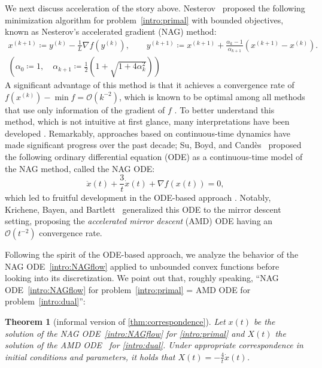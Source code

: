 \documentclass[11pt,a4paper]{article}
\theoremstyle{definition}
\theoremstyle{plain}
\newtheorem{thm}{Theorem}[section]
\begin{document}
We next discuss acceleration of the story above.
Nesterov~\cite{Nesterov1983} proposed the following minimization algorithm for problem~\eqref{intro:primal} with bounded objectives, known as Nesterov's accelerated gradient (NAG) method:
\begin{equation}\label{intro:NAG}
    \begin{gathered}
            x^{(k + 1)} \coloneqq y^{(k)} - \frac1L\nabla f\left(y^{(k)}\right), \qquad y^{(k + 1)} \coloneqq x^{(k + 1)} + \frac{\alpha_k - 1}{\alpha_{k + 1}}\left(x^{(k + 1)} - x^{(k)}\right).\\
        (\alpha_0 \coloneqq 1,\quad \alpha_{k + 1} \coloneqq \frac12\left(1 +\sqrt{1 + 4\alpha_k^2}\right))
    \end{gathered}
\end{equation}
A significant advantage of this method is that it achieves a convergence rate of $f(x^{(k)}) - \min f = \mathcal{O}(k^{-2})$, which is known to be optimal among all methods that use only information of the gradient of $f$ \cite{Nesterov2018}.
To better understand this method, which is not intuitive at first glance, many interpretations have been developed \cite{AS2022,AO2017,DO2019}.
Remarkably, approaches based on continuous-time dynamics have made significant progress over the past decade; Su, Boyd, and Cand\`{e}s~\cite{SBC2016} proposed the following ordinary differential equation (ODE) as a continuous-time model of the NAG method, called the NAG ODE:
\begin{equation}\label{intro:NAGflow}
    \ddot x(t) +\frac3t\dot x(t) + \nabla f(x(t)) = 0,
\end{equation}
which led to fruitful development in the ODE-based approach \cite{SDJS2022,WWJ2016,WilsonPhD,WRJ2021}.
Notably, Krichene, Bayen, and Bartlett~\cite{KBB2015} generalized this ODE to the mirror descent setting, proposing the \textit{accelerated mirror descent} (AMD) ODE having an $\mathcal{O}(t^{-2})$ convergence rate.

Following the spirit of the ODE-based approach, we analyze the behavior of the NAG ODE~\eqref{intro:NAGflow} applied to unbounded convex functions before looking into its discretization.
We point out that, roughly speaking, ``NAG ODE~\eqref{intro:NAGflow} for problem~\eqref{intro:primal} = AMD ODE for problem~\eqref{intro:dual}'':

\begin{thm}[informal version of \cref{thm:correspondence}]
    Let $x(t)$ be the solution of the NAG ODE~\eqref{intro:NAGflow} for \eqref{intro:primal} and $X(t)$ the solution of the AMD ODE~\cite{KBB2015} for \eqref{intro:dual}.
    Under appropriate correspondence in initial conditions and parameters, it holds that $X(t) = -\frac4t\dot x(t)$.
\end{thm}
\end{document}
